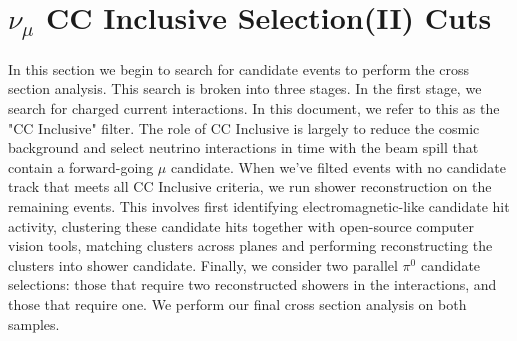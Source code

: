 \clearpage
\section{ $\nu_{\mu}$ CC Inclusive Selection(II) Cuts }

\par In this section we begin to search for candidate events to perform the cross section analysis. This search is broken into three stages.  In the first stage, we search for charged current interactions. In this document, we refer to this as the "CC Inclusive" filter. The role of CC Inclusive is largely to reduce the cosmic background and select neutrino interactions in time with the beam spill that contain a forward-going $\mu$ candidate. When we've filted events with no candidate track that meets all CC Inclusive criteria, we run shower reconstruction on the remaining events.  This involves first identifying electromagnetic-like candidate hit activity, clustering these candidate hits together with open-source computer vision tools, matching clusters across planes and performing reconstructing the clusters into shower candidate.  Finally, we consider two parallel $\pi^0$ candidate selections: those that require two reconstructed showers in the interactions, and those that require one.  We perform our final cross section analysis on both samples.


